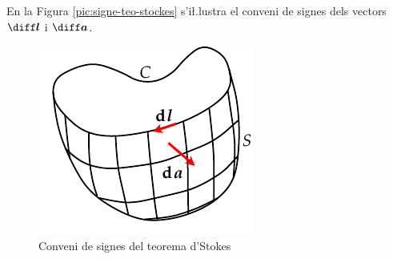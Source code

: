 \documentclass[catalan,a4paper,twoside,11pt]{article}
\begin{document}
En la Figura \vref{pic:signe-teo-stockes} s'i{\l.l}ustra el conveni de
signes dels vectors $\boldsymbol{\diff l}$ i $\boldsymbol{\diff a}$.

\begin{figure}[h]
\centering
     \includegraphics{Imatges/Stokes.pdf}
\caption{Conveni de signes del teorema d'Stokes}
\label{pic:signe-teo-stockes}
\end{figure}
\end{document}
